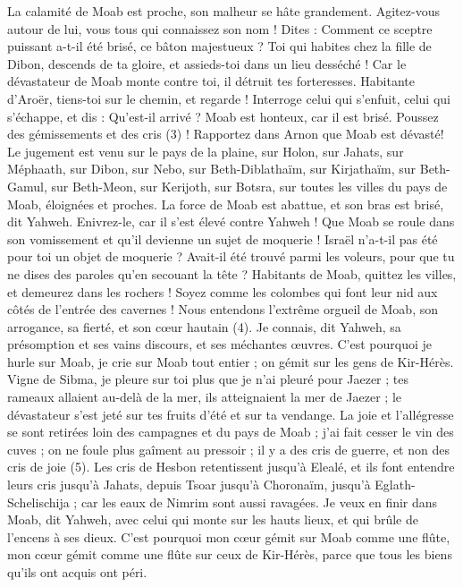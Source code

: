 \begin{multicols}{2}
La calamité de Moab est proche, son malheur se hâte grandement.
Agitez-vous autour de lui, vous tous qui connaissez son nom ! Dites : Comment ce sceptre puissant a-t-il été brisé, ce bâton majestueux ?
Toi qui habites chez la fille de Dibon, descends de ta gloire, et assieds-toi dans un lieu desséché ! Car le dévastateur de Moab monte contre toi, il détruit tes forteresses.
Habitante d'Aroër, tiens-toi sur le chemin, et regarde ! Interroge celui qui s'enfuit, celui qui s'échappe, et dis : Qu'est-il arrivé ?
Moab est honteux, car il est brisé. Poussez des gémissements et des cris\FTNT{} (3) ! Rapportez dans Arnon que Moab est dévasté!
Le jugement est venu sur le pays de la plaine, sur Holon, sur Jahats, sur Méphaath,
sur Dibon, sur Nebo, sur Beth-Diblathaïm,
sur Kirjathaïm, sur Beth-Gamul, sur Beth-Meon,
sur Kerijoth, sur Botsra, sur toutes les villes du pays de Moab, éloignées et proches.
La force de Moab est abattue, et son bras est brisé, dit Yahweh.
Enivrez-le, car il s'est élevé contre Yahweh ! Que Moab se roule dans son vomissement et qu'il devienne un sujet de moquerie !
Israël n'a-t-il pas été pour toi un objet de moquerie ? Avait-il été trouvé parmi les voleurs, pour que tu ne dises des paroles qu'en secouant la tête ?
Habitants de Moab, quittez les villes, et demeurez dans les rochers ! Soyez comme les colombes qui font leur nid aux côtés de l'entrée des cavernes !
Nous entendons l'extrême orgueil de Moab, son arrogance, sa fierté, et son cœur hautain\FTNT{} (4).
Je connais, dit Yahweh, sa présomption et ses vains discours, et ses méchantes œuvres.
C’est pourquoi je hurle sur Moab, je crie sur Moab tout entier ; on gémit sur les gens de Kir-Hérès.
Vigne de Sibma, je pleure sur toi plus que je n'ai pleuré pour Jaezer ; tes rameaux allaient au-delà de la mer, ils atteignaient la mer de Jaezer ; le dévastateur s'est jeté sur tes fruits d'été et sur ta vendange.
La joie et l'allégresse se sont retirées loin des campagnes et du pays de Moab ; j'ai fait cesser le vin des cuves ; on ne foule plus gaîment au pressoir ; il y a des cris de guerre, et non des cris de joie\FTNT{} (5).
Les cris de Hesbon retentissent jusqu’à Elealé, et ils font entendre leurs cris jusqu’à Jahats, depuis Tsoar jusqu'à Choronaïm, jusqu'à Eglath-Schelischija ; car les eaux de Nimrim sont aussi ravagées.
Je veux en finir dans Moab, dit Yahweh, avec celui qui monte sur les hauts lieux, et qui brûle de l'encens à ses dieux.
C'est pourquoi mon cœur gémit sur Moab comme une flûte, mon cœur gémit comme une flûte sur ceux de Kir-Hérès, parce que tous les biens qu'ils ont acquis ont péri.

\end{multicols}
